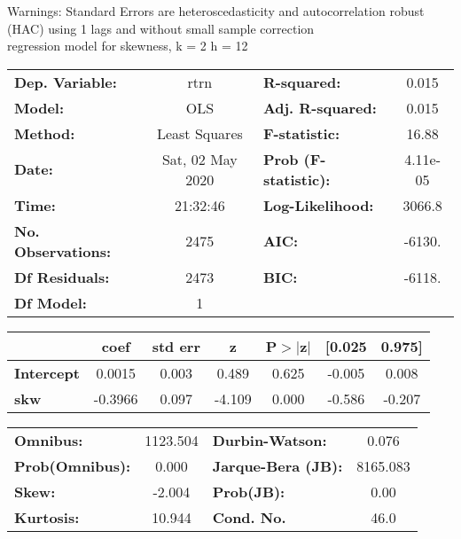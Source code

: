 Warnings: \newline
 [1] Standard Errors are heteroscedasticity and autocorrelation robust (HAC) using 1 lags and without small sample correction\\ 

regression model for skewness, k = 2 h = 12\begin{center}
\begin{tabular}{lclc}
\toprule
\textbf{Dep. Variable:}    &       rtrn       & \textbf{  R-squared:         } &     0.015   \\
\textbf{Model:}            &       OLS        & \textbf{  Adj. R-squared:    } &     0.015   \\
\textbf{Method:}           &  Least Squares   & \textbf{  F-statistic:       } &     16.88   \\
\textbf{Date:}             & Sat, 02 May 2020 & \textbf{  Prob (F-statistic):} &  4.11e-05   \\
\textbf{Time:}             &     21:32:46     & \textbf{  Log-Likelihood:    } &    3066.8   \\
\textbf{No. Observations:} &        2475      & \textbf{  AIC:               } &    -6130.   \\
\textbf{Df Residuals:}     &        2473      & \textbf{  BIC:               } &    -6118.   \\
\textbf{Df Model:}         &           1      & \textbf{                     } &             \\
\bottomrule
\end{tabular}
\begin{tabular}{lcccccc}
                   & \textbf{coef} & \textbf{std err} & \textbf{z} & \textbf{P$> |$z$|$} & \textbf{[0.025} & \textbf{0.975]}  \\
\midrule
\textbf{Intercept} &       0.0015  &        0.003     &     0.489  &         0.625        &       -0.005    &        0.008     \\
\textbf{skw}       &      -0.3966  &        0.097     &    -4.109  &         0.000        &       -0.586    &       -0.207     \\
\bottomrule
\end{tabular}
\begin{tabular}{lclc}
\textbf{Omnibus:}       & 1123.504 & \textbf{  Durbin-Watson:     } &    0.076  \\
\textbf{Prob(Omnibus):} &   0.000  & \textbf{  Jarque-Bera (JB):  } & 8165.083  \\
\textbf{Skew:}          &  -2.004  & \textbf{  Prob(JB):          } &     0.00  \\
\textbf{Kurtosis:}      &  10.944  & \textbf{  Cond. No.          } &     46.0  \\
\bottomrule
\end{tabular}
\end{center}

